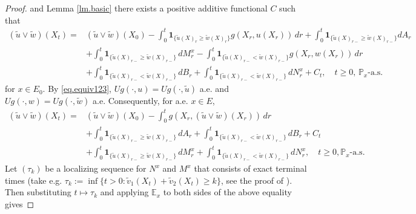 \documentclass[11pt,a4paper,reqno]{amsart}
\theoremstyle{definition}
\numberwithin{equation}{section}
\begin{document}
\begin{proof}
and Lemma \ref{lm.basic} there exists a  positive additive functional  $C$ such that
$$
\begin{aligned}
(\tilde u \vee \tilde w)\left(X_t\right)= & (\tilde u \vee \tilde w)\left(X_0\right)-\int_0^t \mathbf{1}_{\{\tilde u(X)_{r} \geq \tilde w(X)_{r}\}}
g\left(X_r,  u\left(X_r\right)\right) \,d r+\int_0^t \mathbf{1}_{\{\tilde u(X)_{r-} \geq \tilde w(X)_{r-}\}} dA_r \\
& +\int_0^t \mathbf{1}_{\{\tilde u(X)_{r-} \geq \tilde w(X)_{r-}\}} \,d M^x_r
-\int_0^t\mathbf{1}_{\{\tilde u(X)_{r-} < \tilde w(X)_{r-}\}} g\left(X_r,  w\left(X_r\right)\right) \,d r \\
& +\int_0^t \mathbf{1}_{\{\tilde u(X)_{r-} <\tilde w(X)_{r-}\}} \,d B_r+\int_0^t \mathbf{1}_{\{\tilde u(X)_{r-} 
< \tilde w(X)_{r-}\}} \,d N^x_r+C_t, \quad t\ge 0,\, \mathbb P_x \text {-a.s.}
\end{aligned}
$$
for $x\in E_0$.
By \eqref{eq.equiv123}, $Ug(\cdot,u)=Ug(\cdot,\tilde u)$ a.e. and $Ug(\cdot,w)=Ug(\cdot,\tilde w)$ a.e.  Consequently,
for a.e. $x\in E$,
$$
\begin{aligned}
(\tilde u \vee \tilde w)\left(X_t\right)= & (\tilde u \vee \tilde w)\left(X_0\right)
-\int_0^t g\left(X_r,(\tilde u \vee \tilde w)\left(X_r\right)\right) \,d r
\\& +\int_0^t \mathbf{1}_{\{\tilde u(X)_{r-} \geq \tilde w(X)_{r-}\}} \,d A_r
+\int_0^t \mathbf{1}_{\{\tilde u(X)_{r-} < \tilde w(X)_{r-}\}} \,d B_r +C_t
\\&+\int_0^t \mathbf{1}_{\{\tilde u(X)_{r-} \geq \tilde w(X)_{r-}\}} \,d M^x_r
+\int_0^t \mathbf{1}_{\{\tilde u(X)_{r-} < \tilde w(X)_{r-}\}}\,d N^x_r, \quad t \geq 0, \mathbb P_x\text {-a.s. }
\end{aligned}
$$
 Let $(\tau_k)$ be a localizing sequence for $N^x$ and $M^x$ that consists of exact terminal times
 (take e.g. $\tau_k:=\inf\{t>0: \tilde v_1(X_t)+\tilde v_2(X_t)\ge k\}$, see the proof of 
 \cite[Theorem 51.1]{Sharpe}). Then substituting  $t\mapsto \tau_k$
 and applying $\mathbb E_x$ to both sides of the above equality gives


\end{proof}
\end{document}
